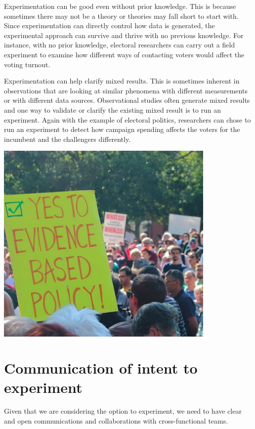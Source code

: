 \documentclass[openany]{book}
\begin{document}
Experimentation can be good even without prior knowledge. This is because sometimes there may not be a theory or theories may fall short to start with. Since experimentation can directly control how data is generated, the experimental approach can survive and thrive with no previous knowledge. For instance, with no prior knowledge, electoral researchers can carry out a field experiment to examine how different ways of contacting voters would affect the voting turnout.

Experimentation can help clarify mixed results. This is sometimes inherent in observations that are looking at similar phenomena with different measurements or with different data sources. Observational studies often generate mixed results and one way to validate or clarify the existing mixed result is to run an experiment. Again with the example of electoral politics, researchers can chose to run an experiment to detect how campaign spending affects the voters for the incumbent and the challengers differently.

\includegraphics[width=0.8\textwidth,height=\textheight]{fig/march4science.png}

\hypertarget{communication-of-intent-to-experiment}{%
\section{Communication of intent to experiment}\label{communication-of-intent-to-experiment}}

Given that we are considering the option to experiment, we need to have clear and open communications and collaborations with cross-functional teams.
\end{document}
